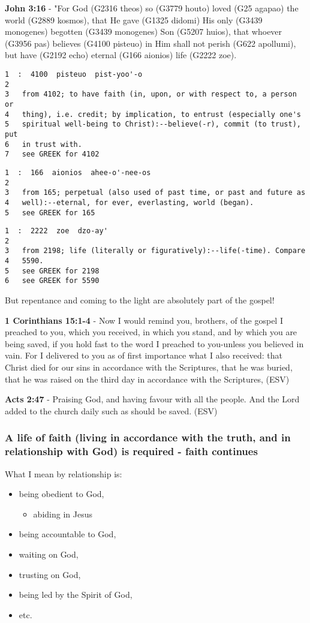 \documentclass[11pt]{article}
\begin{document}
\textbf{John 3:16} - "For God (G2316 theos) so (G3779 houto) loved (G25 agapao) the world (G2889 kosmos), that He gave (G1325 didomi) His only (G3439 monogenes) begotten (G3439 monogenes) Son (G5207 huios), that whoever (G3956 pas) believes (G4100 pisteuo) in Him shall not perish (G622 apollumi), but have (G2192 echo) eternal (G166 aionios) life (G2222 zoe).

\begin{verbatim}
1  :  4100  pisteuo  pist-yoo'-o
2  
3   from 4102; to have faith (in, upon, or with respect to, a person or
4   thing), i.e. credit; by implication, to entrust (especially one's
5   spiritual well-being to Christ):--believe(-r), commit (to trust), put
6   in trust with.
7   see GREEK for 4102
\end{verbatim}

\begin{verbatim}
1  :  166  aionios  ahee-o'-nee-os
2  
3   from 165; perpetual (also used of past time, or past and future as
4   well):--eternal, for ever, everlasting, world (began).
5   see GREEK for 165
\end{verbatim}

\begin{verbatim}
1  :  2222  zoe  dzo-ay'
2  
3   from 2198; life (literally or figuratively):--life(-time). Compare
4   5590.
5   see GREEK for 2198
6   see GREEK for 5590
\end{verbatim}

But repentance and coming to the light are absolutely part of the gospel!

\textbf{1 Corinthians 15:1-4} -  Now I would remind you, brothers, of the gospel I preached to you, which you received, in which you stand, and by which you are being saved, if you hold fast to the word I preached to you-unless you believed in vain.  For I delivered to you as of first importance what I also received: that Christ died for our sins in accordance with the Scriptures, that he was buried, that he was raised on the third day in accordance with the Scriptures,  (ESV)

\textbf{Acts 2:47} - Praising God, and having favour with all the people. And the Lord added to the church daily such as should be saved. (ESV)

\subsubsection{A life of faith (living in accordance with the truth, and in relationship with God) is required - faith continues}
\label{sec:org17cffd8}
What I mean by relationship is:
\begin{itemize}
\item being obedient to God,
\begin{itemize}
\item abiding in Jesus
\end{itemize}
\item being accountable to God,
\item waiting on God,
\item trusting on God,
\item being led by the Spirit of God,
\item etc.
\end{itemize}
\end{document}
